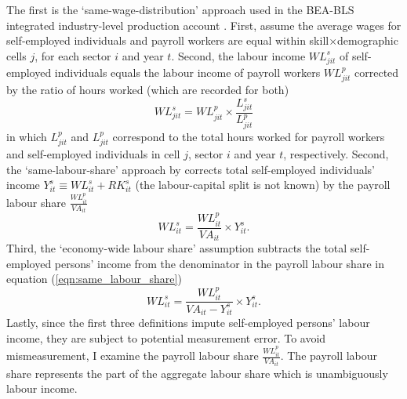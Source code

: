 The first is the `same-wage-distribution' approach used in the BEA-BLS integrated industry-level production account \citep{eldridgeBEABLSIntegratedIndustrylevel2020}. First, assume the average wages for self-employed individuals and payroll workers are equal within skill$\times$demographic cells $j$, for each sector $i$ and year $t$. Second, the labour income $WL_{jit}^{s}$ of self-employed individuals equals the labour income of payroll workers $WL_{jit}^{p}$ corrected by the ratio of hours worked (which are recorded for both)
\begin{equation}
    WL_{jit}^{s} = WL_{jit}^{p} \times \frac{L_{jit}^{s}}{L_{jit}^{p}}
\end{equation}
in which $L_{jit}^{p}$ and $L_{jit}^{p}$ correspond to the total hours worked for payroll workers and self-employed individuals in cell $j$, sector $i$ and year $t$, respectively. Second, the `same-labour-share' approach by \citet{mendieta-munozDeclineUSLabor2021} corrects total self-employed individuals' income $Y_{it}^{s} \equiv WL_{it}^{s} + RK_{it}^{s}$ (the labour-capital split is not known) by the payroll labour share $\frac{WL_{it}^{p}}{VA_{it}}$
\begin{equation}
    WL_{it}^{s} = \frac{WL_{it}^{p}}{VA_{it}} \times Y_{it}^{s}.
\label{eqn:same_labour_share}
\end{equation}
Third, the `economy-wide labour share' assumption subtracts the total self-employed persons' income from the denominator in the payroll labour share in equation (\ref{eqn:same_labour_share})
\begin{equation}
    WL_{it}^{s} = \frac{WL_{it}^{p}}{VA_{it} - Y_{it}^{s}} \times Y_{it}^{s}.
\label{eqn:economy_wide}
\end{equation}
Lastly, since the first three definitions impute self-employed persons' labour income, they are subject to potential measurement error. To avoid mismeasurement, I examine the payroll labour share $\frac{WL_{it}^{p}}{VA_{it}}$. The payroll labour share represents the part of the aggregate labour share which is unambiguously labour income. 

